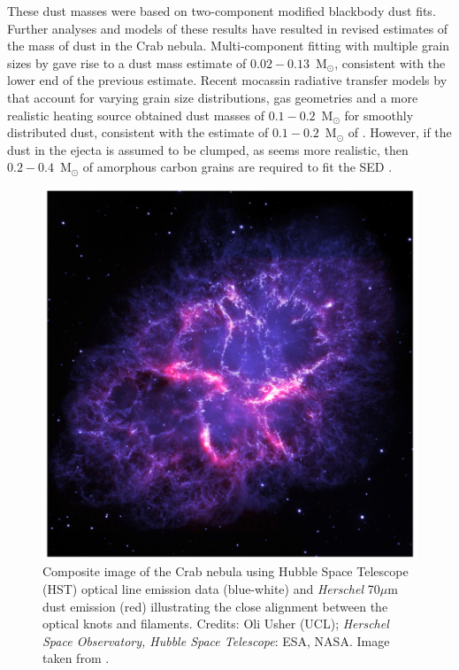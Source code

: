  These dust masses were based on  two-component modified blackbody dust fits.  Further analyses and models of these results have resulted in revised estimates of the mass of dust in the Crab nebula.  Multi-component fitting with multiple grain sizes by \citet{Temim2013} gave rise to a dust mass estimate of $0.02-0.13$~M$_{\odot}$, consistent with the lower end of the previous estimate.  Recent {\sc mocassin} radiative transfer models by \citet{Owen2015} that account for varying grain size distributions, gas geometries and a more realistic heating source obtained dust masses of $0.1-0.2$~M$_{\odot}$ for smoothly distributed dust, consistent with the estimate of $0.1-0.2$~M$_{\odot}$ of \citet{Gomez2012}.  However, if the dust in the ejecta is assumed to be clumped, as seems more realistic, then $0.2 - 0.4$~M$_{\odot}$ of amorphous carbon grains are required to fit the SED \citep{Owen2015}. 
 
 \begin{figure}
\centering
\includegraphics[clip=true,scale=0.3,trim= 0 0 0 0]{chapters/chapter1/figs/Crab.png}
\caption{Composite image of the Crab nebula using Hubble Space Telescope (HST) optical line emission data (blue-white) and {\em Herschel} 70$\mu$m dust emission (red) illustrating the close alignment between the optical knots and filaments.  Credits: Oli Usher (UCL); \textit{Herschel Space Observatory, Hubble Space Telescope}: ESA, NASA.  Image taken from \citet{Owen2015}.}
\label{fig:Crab}
\end{figure}
 
